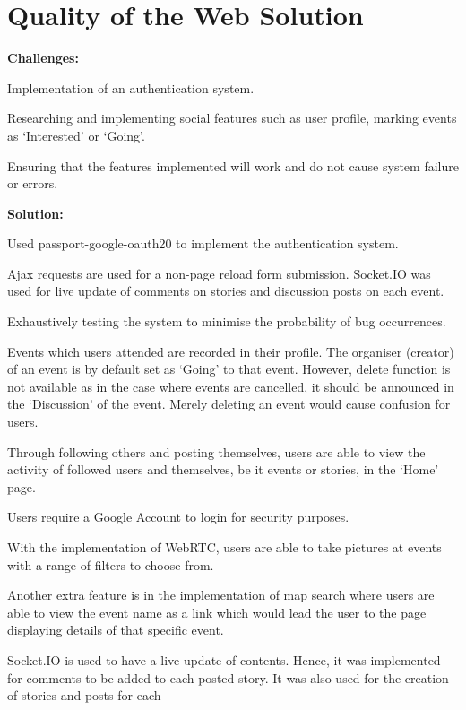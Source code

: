 \documentclass[11pt, a4paper]{article}
\begin{document}
\section{Quality of the Web Solution}
\textbf{Challenges:}
\begin{enumerate*}[label=\textbf{\arabic*})]
\item Implementation of an authentication system.
\item Researching and implementing social features such as user profile, marking events as
`Interested' or `Going'.
\item Ensuring that the features implemented will work and do not cause system failure or errors.
\end{enumerate*}
%
\textbf{Solution:}
\begin{enumerate*}[label=\textbf{\arabic*})]
\item Used passport-google-oauth20 \cite{passport_google} to implement the authentication system.
\item Ajax requests are used for a non-page reload form submission. Socket.IO was used for live
update of comments on stories and discussion posts on each event.
\item Exhaustively testing the system to minimise the probability of bug occurrences.
\item Events which users attended are recorded in their profile. The organiser (creator) of an event
is by default set as `Going' to that event. However, delete function is not available as in the case
where events are cancelled, it should be announced in the `Discussion' of the event. Merely deleting
an event would cause confusion for users.
\item Through following others and posting themselves, users are able to view the activity of
followed users and themselves, be it events or stories, in the `Home' page.
\item Users require a Google Account to login for security purposes.
\item With the implementation of WebRTC, users are able to take pictures at events with a range of
filters to choose from.
\item Another extra feature is in the implementation of map search where users are able to view the
event name as a link which would lead the user to the page displaying details of that specific
event.
\item Socket.IO is used to have a live update of contents. Hence, it was implemented for comments to
be added to each posted story. It was also used for the creation of stories and posts for each

\end{enumerate*}
\end{document}
